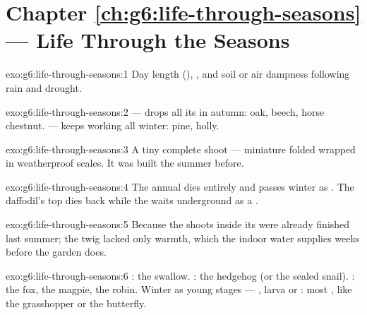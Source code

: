 \section*{Chapter \ref{ch:g6:life-through-seasons} --- Life Through the Seasons}

\begin{solution}{exo:g6:life-through-seasons:1}
Day length (), , and soil or air dampness
following rain and drought.
\end{solution}

\begin{solution}{exo:g6:life-through-seasons:2}
 --- drops all its  in autumn: oak, beech,
horse chestnut.  --- keeps working  all
winter: pine, holly.
\end{solution}

\begin{solution}{exo:g6:life-through-seasons:3}
A tiny complete shoot --- miniature folded  wrapped in
weatherproof scales. It was built the summer before.
\end{solution}

\begin{solution}{exo:g6:life-through-seasons:4}
The annual dies entirely and passes winter as . The
daffodil's top dies back while the  waits underground
as a .
\end{solution}

\begin{solution}{exo:g6:life-through-seasons:5}
Because the shoots inside its  were already finished
last summer; the twig lacked only warmth, which the indoor
water supplies weeks before the garden does.
\end{solution}

\begin{solution}{exo:g6:life-through-seasons:6}
: the swallow. : the hedgehog (or the sealed
snail). : the fox, the magpie, the robin. Winter
as young stages --- , larva or : most ,
like the grasshopper or the butterfly.
\end{solution}

